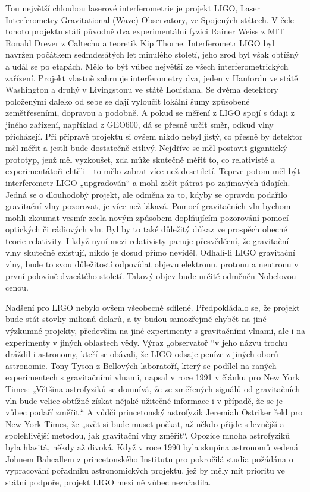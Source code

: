   Tou největší chloubou laserové interferometrie je projekt LIGO, Laser Interferometry Gravitational
  (Wave) Observatory, ve Spojených státech. V čele tohoto projektu stáli původně dva experimentální
  fyzici Rainer Weiss z MIT Ronald Drever z Caltechu a teoretik Kip Thorne. Interferometr LIGO byl
  navržen počátkem sedmdesátých let minulého století, jeho zrod byl však obtížný a udál se po
  etapách. Mělo to být vůbec největší ze všech interferometrických zařízení. Projekt vlastně
  zahrnuje interferometry dva, jeden v Hanfordu ve státě Washington a druhý v Livingstonu ve státě
  Louisiana. Se dvěma detektory položenými daleko od sebe se dají vyloučit lokální šumy způsobené
  zemětřeseními, dopravou a podobně. A pokud se měření z LIGO spojí s údaji z jiného zařízení,
  například z GEO600, dá se přesně určit směr, odkud vlny přicházejí. Při přípravě projektu si ovšem
  nikdo nebyl jistý, co přesně by detektor měl měřit a jestli bude dostatečně citlivý. Nejdříve se
  měl postavit gigantický prototyp, jenž měl vyzkoušet, zda může skutečně měřit to, co relativisté a
  experimentátoři chtěli - to mělo zabrat více než desetiletí. Teprve potom měl být interferometr
  LIGO „upgradován“ a mohl začít pátrat po zajímavých údajích. Jedná se o dlouhodobý projekt, ale
  odměna za to, kdyby se opravdu podařilo gravitační vlny pozorovat, je více než lákavá. Pomocí
  gravitačních vln bychom mohli zkoumat vesmír zcela novým způsobem doplňujícím pozorování pomocí
  optických či rádiových vln. Byl by to také důležitý důkaz ve prospěch obecné teorie relativity. I
  když nyní mezi relativisty panuje přesvědčení, že gravitační vlny skutečně existují, nikdo je
  dosud přímo neviděl. Odhalí-li LIGO gravitační vlny, bude to svou důležitostí odpovídat objevu
  elektronu, protonu a neutronu v první polovině dvacátého století. Takový objev bude určitě odměněn
  Nobelovou cenou. 

  Nadšení pro LIGO nebylo ovšem všeobecně sdílené. Předpokládalo se, že projekt bude stát stovky
  milionů dolarů, a ty budou samozřejmě chybět na jiné výzkumné projekty, především na jiné
  experimenty s gravitačními vlnami, ale i na experimenty v jiných oblastech vědy. Výraz „observatoř
  “v jeho názvu trochu dráždil i astronomy, kteří se obávali, že LIGO odsaje peníze z jiných oborů
  astronomie. Tony Tyson z Bellových laboratoří, který se podílel na raných experimentech s
  gravitačními vlnami, napsal v roce 1991 v článku pro New York Times: „Většina astrofyziků se
  domnívá, že ze změřených signálů od gravitačních vln bude velice obtížné získat nějaké užitečné
  informace i v případě, že se je vůbec podaří změřit.“ A vůdčí princetonský astrofyzik Jeremiah
  Ostriker řekl pro New York Times, že „svět si bude muset počkat, až někdo přijde s levnější a
  spolehlivější metodou, jak gravitační vlny změřit“. Opozice mnoha astrofyziků byla hlasitá, někdy
  až divoká. Když v roce 1990 byla skupina astronomů vedená Johnem Bahcallem z princetonského
  Institutu pro pokročilá studia požádána o vypracování pořadníku astronomických projektů, jež by
  měly mít prioritu ve státní podpoře, projekt LIGO mezi ně vůbec nezařadila. 

